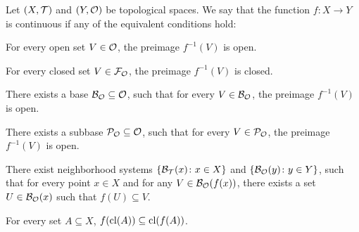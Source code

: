 \begin{definition}\label{def:continuous_function}\cite[33]{Lectures:general_topology}
  Let $(X, \mathcal T)$ and $(Y, \mathcal O)$ be topological spaces. We say that the function $f: X \to Y$ is continuous if any of the equivalent conditions hold:
  \begin{defenum}
    \item\label{def:continuous_function/direct} For every open set $V \in \mathcal O$, the preimage $f^{-1}(V)$ is open.
    \item\label{def:continuous_function/closed} For every closed set $V \in \mathcal F_{\mathcal O}$, the preimage $f^{-1}(V)$ is closed.
    \item\label{def:continuous_function/base} There exists a base $\mathcal B_{\mathcal O} \subseteq \mathcal O$, such that for every $V \in \mathcal B_{\mathcal O}$, the preimage $f^{-1}(V)$ is open.
    \item\label{def:continuous_function/subbase} There exists a subbase $\mathcal P_{\mathcal O} \subseteq \mathcal O$, such that for every $V \in \mathcal P_{\mathcal O}$, the preimage $f^{-1}(V)$ is open.
    \item\label{def:continuous_function/local_base} There exist neighborhood systems $\{ \mathcal B_{\mathcal T}(x) \colon x \in X \}$ and $\{ \mathcal B_{\mathcal O}(y) \colon y \in Y \}$, such that for every point $x \in X$ and for any $V \in \mathcal B_{\mathcal O}(f(x))$, there exists a set $U \in \mathcal B_{\mathcal O}(x)$ such that $f(U) \subseteq V$.
    \item\label{def:continuous_function/closure} For every set $A \subseteq X$, $f(\operatorname{cl}(A)) \subseteq \operatorname{cl}(f(A))$.
  \end{defenum}
\end{definition}
